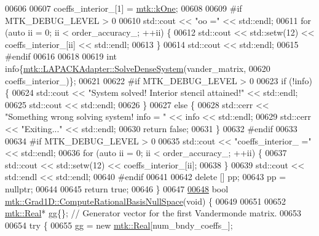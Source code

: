 \begin{DoxyCode}
{{00606 
00607   coeffs\_interior\_[1] = \hyperlink{group__c01-roots_ga26407c24d43b6b95480943340d285c71}{mtk::kOne};
00608 
00609 \textcolor{preprocessor}{  #if MTK\_DEBUG\_LEVEL > 0}
00610   std::cout << \textcolor{stringliteral}{"oo ="} << std::endl;
00611   \textcolor{keywordflow}{for} (\textcolor{keyword}{auto} ii = 0; ii < order\_accuracy\_; ++ii) \{
00612     std::cout << std::setw(12) << coeffs\_interior\_[ii] << std::endl;
00613   \}
00614   std::cout << std::endl;
00615 \textcolor{preprocessor}{  #endif}
00616 
00618 
00619   \textcolor{keywordtype}{int} info\{\hyperlink{classmtk_1_1LAPACKAdapter_a7428bccf74fd4a4af68fb7233846da22}{mtk::LAPACKAdapter::SolveDenseSystem}(vander\_matrix,
00620                                                 coeffs\_interior\_)\};
00621 
00622 \textcolor{preprocessor}{  #if MTK\_DEBUG\_LEVEL > 0}
00623   \textcolor{keywordflow}{if} (!info) \{
00624     std::cout << \textcolor{stringliteral}{"System solved! Interior stencil attained!"} << std::endl;
00625     std::cout << std::endl;
00626   \}
00627   \textcolor{keywordflow}{else} \{
00628     std::cerr << \textcolor{stringliteral}{"Something wrong solving system! info = "} << info << std::endl;
00629     std::cerr << \textcolor{stringliteral}{"Exiting..."} << std::endl;
00630     \textcolor{keywordflow}{return} \textcolor{keyword}{false};
00631   \}
00632 \textcolor{preprocessor}{  #endif}
00633 
00634 \textcolor{preprocessor}{  #if MTK\_DEBUG\_LEVEL > 0}
00635   std::cout << \textcolor{stringliteral}{"coeffs\_interior\_ ="} << std::endl;
00636   \textcolor{keywordflow}{for} (\textcolor{keyword}{auto} ii = 0; ii < order\_accuracy\_; ++ii) \{
00637     std::cout << std::setw(12) << coeffs\_interior\_[ii];
00638   \}
00639   std::cout << std::endl << std::endl;
00640 \textcolor{preprocessor}{  #endif}
00641 
00642   \textcolor{keyword}{delete} [] pp;
00643   pp = \textcolor{keyword}{nullptr};
00644 
00645   \textcolor{keywordflow}{return} \textcolor{keyword}{true};
00646 \}
00647 
\hypertarget{mtk__grad__1d_8cc_source_l00648}{}\hyperlink{classmtk_1_1Grad1D_a2d03e6a3961bee558f575ec4099782a9}{00648} \textcolor{keywordtype}{bool} \hyperlink{classmtk_1_1Grad1D_a2d03e6a3961bee558f575ec4099782a9}{mtk::Grad1D::ComputeRationalBasisNullSpace}(\textcolor{keywordtype}{void}) \{
00649 
00651 
00652   \hyperlink{group__c01-roots_gac080bbbf5cbb5502c9f00405f894857d}{mtk::Real}* gg\{\}; \textcolor{comment}{// Generator vector for the first Vandermonde matrix.}
00653 
00654   \textcolor{keywordflow}{try} \{
00655     gg = \textcolor{keyword}{new} \hyperlink{group__c01-roots_gac080bbbf5cbb5502c9f00405f894857d}{mtk::Real}[num\_bndy\_coeffs\_];
}}
\end{DoxyCode}
